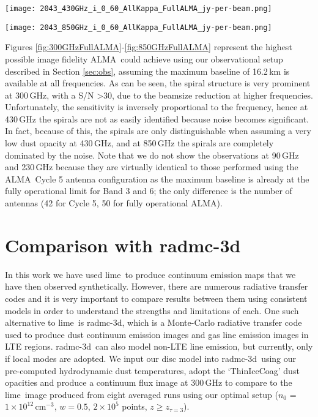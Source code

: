 \documentclass[fleqn,usenatbib]{mnras}
\newcommand{\nzero}{$n_0$ = $1\times10^{12}\,\mathrm{cm^{-3}}$}
\newcommand{\lime}{{\sc lime}}
\newcommand{\radmc}{{\sc radmc-3d}}
\newcommand{\alma}{ALMA}
\begin{document}
\begin{figure*}
    \texttt{[image: 2043\_430GHz\_i\_0\_60\_AllKappa\_FullALMA\_jy-per-beam.png]}
    \caption{Same as Figure \ref{fig:300GHzFullALMA} but synthesised at 430\,GHz with a beamsize of 0.010$\,\times\,$0.010\,arcsec and a noise level of approximately 85\,\textmu Jy per beam.}
    \label{fig:430GHzFullALMA}
\end{figure*}

\begin{figure*}
    \texttt{[image: 2043\_850GHz\_i\_0\_60\_AllKappa\_FullALMA\_jy-per-beam.png]}
    \caption{Same as Figure \ref{fig:300GHzFullALMA} but synthesised at 850\,GHz with a beamsize of 0.005$\,\times\,$0.005\,arcsec and a noise level of approximately 25\,\textmu Jy per beam.}
    \label{fig:850GHzFullALMA}
\end{figure*}

Figures \ref{fig:300GHzFullALMA}-\ref{fig:850GHzFullALMA} represent the highest possible image fidelity \alma\ could achieve using our observational setup described in Section \ref{sec:obs}, assuming the maximum baseline of 16.2\,km is available at all frequencies. As can be seen, the spiral structure is very prominent at 300\,GHz, with a S/N \textgreater 30, due to the beamsize reduction at higher frequencies. Unfortunately, the sensitivity is inversely proportional to the frequency, hence at 430\,GHz the spirals are not as easily identified because noise becomes significant. In fact, because of this, the spirals are only distinguishable when assuming a very low dust opacity at 430\,GHz, and at 850\,GHz the spirals are completely dominated by the noise. Note that we do not show the observations at 90\,GHz and 230\,GHz because they are virtually identical to those performed using the \alma\ Cycle 5 antenna configuration as the maximum baseline is already at the fully operational limit for Band 3 and 6; the only difference is the number of antennas (42 for Cycle 5, 50 for fully operational \alma).

\section[radmc-3d]{Comparison with \radmc}
\label{sec:RADMC3D}

In this work we have used \lime\ to produce continuum emission maps that we have then observed synthetically. However, there are numerous radiative transfer codes and it is very important to compare results between them using consistent models in order to understand the strengths and limitations of each. One such alternative to \lime\ is \radmc, which is a Monte-Carlo radiative transfer code used to produce dust continuum emission images and gas line emission images in LTE regions. \radmc\ can also model non-LTE line emission, but currently, only if local modes are adopted. We input our disc model into \radmc\, using our pre-computed hydrodynamic dust temperatures, adopt the `ThinIceCoag' dust opacities and produce a continuum flux image at 300\,GHz to compare to the \lime\ image produced from eight averaged runs using our optimal setup (\nzero, $w = 0.5$, $2 \times 10^5$ points, $z \geq z_{\tau=3}$).
\end{document}
